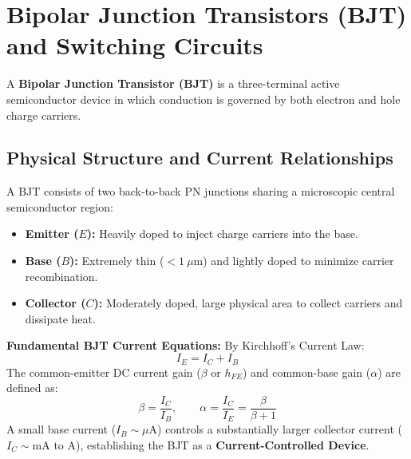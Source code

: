 \section{Bipolar Junction Transistors (BJT) and Switching Circuits}
\label{sec:bjts}

A \textbf{Bipolar Junction Transistor (BJT)} is a three-terminal active semiconductor device in which conduction is governed by both electron and hole charge carriers.

\subsection{Physical Structure and Current Relationships}
A BJT consists of two back-to-back PN junctions sharing a microscopic central semiconductor region:
\begin{itemize}
    \item \textbf{Emitter ($E$):} Heavily doped to inject charge carriers into the base.
    \item \textbf{Base ($B$):} Extremely thin ($<1\ \mu\text{m}$) and lightly doped to minimize carrier recombination.
    \item \textbf{Collector ($C$):} Moderately doped, large physical area to collect carriers and dissipate heat.
\end{itemize}

\textbf{Fundamental BJT Current Equations:}
By Kirchhoff's Current Law:
\begin{equation}
\label{eq:bjt_currents}
\boxed{I_E = I_C + I_B}
\end{equation}
The common-emitter DC current gain ($\beta$ or $h_{FE}$) and common-base gain ($\alpha$) are defined as:
\begin{equation}
\label{eq:bjt_gains}
\boxed{\beta = \frac{I_C}{I_B}, \qquad \alpha = \frac{I_C}{I_E} = \frac{\beta}{\beta + 1}}
\end{equation}
A small base current ($I_B \sim \mu\text{A}$) controls a substantially larger collector current ($I_C \sim \text{mA}$ to $\text{A}$), establishing the BJT as a \textbf{Current-Controlled Device}.

